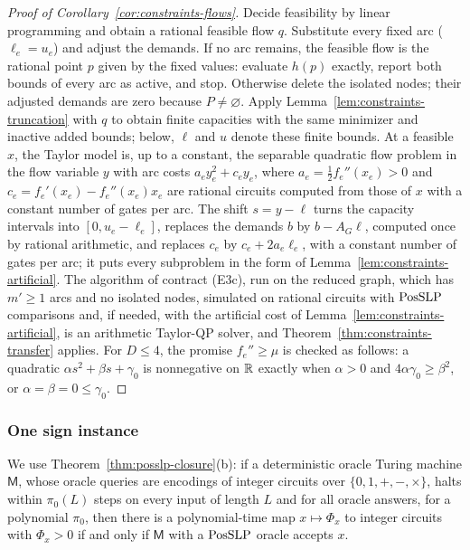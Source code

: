 \begin{proof}[Proof of Corollary~\ref{cor:constraints-flows}]
Decide feasibility by linear programming and obtain a rational feasible flow
$q$. Substitute every fixed arc ($\ell_e=u_e$) and adjust the demands. If no
arc remains, the feasible flow is the rational point $p$ given by the fixed
values: evaluate $h(p)$ exactly, report both bounds of every arc as active,
and stop. Otherwise delete the isolated nodes; their adjusted demands are
zero because $P\ne\varnothing$. Apply Lemma~\ref{lem:constraints-truncation}
with $q$ to obtain finite capacities with the same minimizer and inactive
added bounds; below, $\ell$ and $u$ denote these finite bounds. At a feasible
$x$, the Taylor model is, up to a constant, the separable quadratic flow
problem in the flow variable $y$ with arc costs $a_ey_e^2+c_ey_e$, where
$a_e=\frac12f_e''(x_e)>0$ and $c_e=f_e'(x_e)-f_e''(x_e)x_e$ are rational
circuits computed from those of $x$ with a constant number of gates per arc.
The shift $s=y-\ell$ turns the capacity intervals into $[0,u_e-\ell_e]$,
replaces the demands $b$ by $b-A_G\ell$, computed once by rational
arithmetic, and replaces $c_e$ by $c_e+2a_e\ell_e$, with a constant number of
gates per arc; it puts every subproblem in the form of
Lemma~\ref{lem:constraints-artificial}.
The algorithm of contract (E3c), run on the reduced graph, which has
$m'\ge1$ arcs and no isolated nodes, simulated on rational circuits with
$\mathrm{PosSLP}$ comparisons and, if needed, with the artificial cost of
Lemma~\ref{lem:constraints-artificial}, is an arithmetic Taylor-QP solver, and
Theorem~\ref{thm:constraints-transfer} applies. For $D\le4$, the promise
$f_e''\ge\mu$ is checked as follows: a quadratic $\alpha s^2+\beta s+\gamma_0$
is nonnegative on $\mathbb R$ exactly when $\alpha>0$ and $4\alpha\gamma_0\ge\beta^2$,
or $\alpha=\beta=0\le\gamma_0$.
\end{proof}

\subsubsection{One sign instance}
\label{app:constraints-single-sign}

We use Theorem~\ref{thm:posslp-closure}(b): if a deterministic oracle Turing
machine $\mathsf M$, whose oracle queries are encodings of integer circuits
over $\{0,1,+,-,\times\}$, halts within $\pi_0(L)$ steps on every input of
length $L$ and for all oracle answers, for a polynomial $\pi_0$, then there is
a polynomial-time map $x\mapsto\Phi_x$ to integer circuits with $\Phi_x>0$ if
and only if $\mathsf M$ with a $\mathrm{PosSLP}$ oracle accepts $x$.

